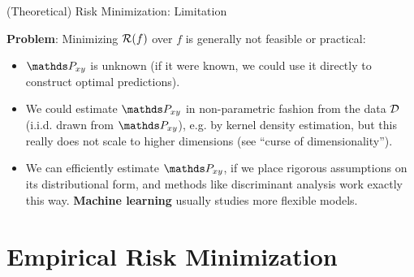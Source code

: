 \begin{vbframe}{(Theoretical) Risk Minimization: Limitation} 


\textbf{Problem}: Minimizing $\mathcal{R}(f)$ over $f$ is generally not feasible or practical:

\begin{itemize}
\item $\Pxy$ is unknown (if it were known, we could use it directly to construct optimal predictions).
\item We could estimate $\Pxy$ in non-parametric fashion from the data $\mathcal{D}$ (i.i.d. drawn from $\Pxy$), e.g. by kernel density estimation, but this really does not scale to higher dimensions (see \enquote{curse of dimensionality}).
\item We can efficiently estimate $\Pxy$, if we place rigorous assumptions on its distributional form, and methods like discriminant analysis work exactly this way. \textbf{Machine learning} usually studies more flexible models.
\end{itemize}

\end{vbframe}


\section{Empirical Risk Minimization}




